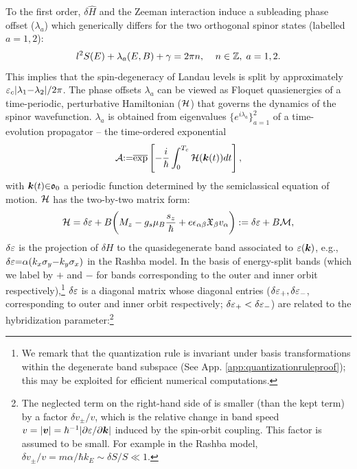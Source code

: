 \documentclass[aps, prb, showpacs, twocolumn, notitlepage, superscriptaddress]{revtex4-1}
\begin{document}

To the first order, $\delta \hat{H}$ and the Zeeman interaction induce a subleading phase offset ($\lambda_a$) which generically differs for the two orthogonal spinor states (labelled $a{=}1,2$):
\begin{equation}
l^2S(E)+\lambda_a(E,B)+\gamma=2\pi n,\;\;\;\;  n\in \mathbb{Z},\;a=1,2. \label{eq:rule}
\end{equation}
This implies that the spin-degeneracy of Landau levels is split   by approximately  $\varepsilon_c|\lambda_1{-}\lambda_2|/2\pi$. The phase offsets $\lambda_a$ can be viewed as Floquet quasienergies of a time-periodic, perturbative Hamiltonian (${\cal H}$) that governs the dynamics of the spinor wavefunction.  $\lambda_a$ is obtained  from  eigenvalues $\{e^{i\lambda_a}\}_{a=1}^2$ of a time-evolution propagator -- the time-ordered exponential 
\begin{equation}
{\cal A}{:}{=}\overline{\exp}\left[-\frac{i}{\hbar}\int_0^{T_c} {\cal H}(\boldsymbol{k}(t)) dt\right],
\label{eq:prop}
\end{equation} 
with $\boldsymbol{k}(t){\in}\mathfrak{o}_0$ a periodic function determined by the semiclassical equation of motion.   ${\cal H}$ has the two-by-two matrix form:
\begin{equation}
  {\cal H}=\delta \varepsilon +B\bigg(M_z -g_s\mu_{B}\frac{s_z}{\hbar} + e\epsilon_{\alpha\beta}\mathfrak{X}_{\beta}v_{\alpha}\bigg):=\delta \varepsilon+B{\cal M},\label{eq:H1}
\end{equation}
$\delta \varepsilon$ is the projection of $\delta H$ to the quasidegenerate band associated to $\varepsilon(\boldsymbol{k})$, e.g., $\delta \varepsilon{=}\alpha(k_x\sigma_y{-}k_y\sigma_x)$ in the Rashba model. In the basis of energy-split bands (which we label by ${+}$ and $-$ for bands corresponding to the outer and inner orbit respectively),\footnote{We remark that the quantization rule is invariant under basis transformations within the degenerate band subspace (See App. \ref{app:quantizationruleproof}); this may be exploited for efficient numerical computations.} $\delta \varepsilon$ is a diagonal matrix whose diagonal entries ($\delta \varepsilon_+,\delta \varepsilon_-$, corresponding to outer and inner orbit respectively; $\delta \varepsilon_+<\delta \varepsilon_-$) are related to the hybridization parameter:\footnote{The neglected term on the right-hand side of   is smaller (than the kept term) by a factor $\delta v_{\pm}/v$, which is the relative change in band speed $v=|\boldsymbol{v}|=\hbar^{-1}|\partial \varepsilon/\partial \boldsymbol{k}|$ induced by the spin-orbit coupling. This factor is assumed to be small.  For example in the Rashba model, $\delta v_{\pm}/v=m\alpha/\hbar k_E{\sim}\delta S/S{\ll}1$.}   
\end{document}

